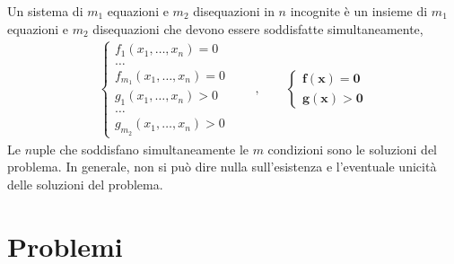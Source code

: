 \documentclass[letterpaper,10pt,italian]{jupyterBook}
\begin{document}
\sphinxAtStartPar
{} Un sistema di \(m_1\) equazioni e \(m_2\) disequazioni in \(n\) incognite è un insieme di \(m_1\) equazioni e \(m_2\) disequazioni che devono essere soddisfatte simultaneamente,
\begin{equation*}
\begin{split}
\begin{cases} f_1(x_1,\dots,x_n) = 0 \\ \dots \\ f_{m_1}(x_1,\dots,x_n) = 0 \\ g_1(x_1,\dots,x_n) > 0 \\ \dots \\g_{m_2}(x_1, \dots, x_n) > 0 \end{cases}
\qquad , \qquad \begin{cases} \mathbf{f}(\mathbf{x}) = \mathbf{0} \\ \mathbf{g}(\mathbf{x}) > \mathbf{0} \end{cases}
\end{split}
\end{equation*}
\sphinxAtStartPar
Le \(n\)\sphinxhyphen{}uple che soddisfano simultaneamente le \(m\) condizioni sono le soluzioni del problema. In generale, non si può dire nulla sull’esistenza e l’eventuale unicità delle soluzioni del problema.




\section{Problemi}
\label{\detokenize{ch/algebra/real-n-algebra:id1}}
\end{document}
